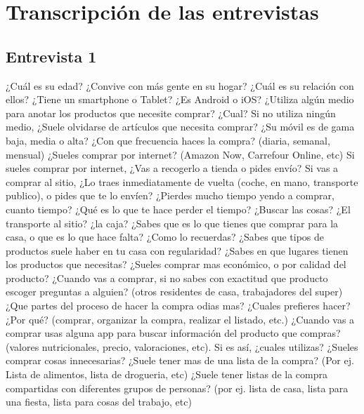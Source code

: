 \chapter{Transcripción de las entrevistas}
\label{ch:entrevistas}
\section{Entrevista 1}
\begin{description}
    \preg ¿Cuál es su edad?
    \preg ¿Convive con más gente en su hogar? ¿Cuál es su relación con ellos?
    \preg ¿Tiene un smartphone o Tablet? ¿Es Android o iOS?
    \preg ¿Utiliza algún medio para anotar los productos que necesite comprar? ¿Cual?
    \preg Si no utiliza ningún medio, ¿Suele olvidarse de artículos que necesita comprar?
    \preg ¿Su móvil es de gama baja, media o alta?
    \preg ¿Con que frecuencia haces la compra? (diaria, semanal, mensual)
    \preg ¿Sueles comprar por internet? (Amazon Now, Carrefour Online, etc)
    \preg Si sueles comprar por internet, ¿Vas a recogerlo a tienda o pides envío?
    \preg Si vas a comprar al sitio, ¿Lo traes inmediatamente de vuelta (coche, en mano, transporte publico), o pides que te lo envíen?
    \preg ¿Pierdes mucho tiempo yendo a comprar, cuanto tiempo?
    \preg ¿Qué es lo que te hace perder el tiempo? ¿Buscar las cosas? ¿El transporte al sitio? ¿la caja?
    \preg ¿Sabes que es lo que tienes que comprar para la casa, o que es lo que hace falta? ¿Como lo recuerdas?
    \preg ¿Sabes que tipos de productos suele haber en tu casa con regularidad?
    \preg ¿Sabes en que lugares tienen los productos que necesitas?
    \preg ¿Sueles comprar mas económico, o por calidad del producto?
    \preg ¿Cuando vas a comprar, si no sabes con exactitud que producto escoger preguntas a alguien? (otros residentes de casa, trabajadores del super)
    \preg ¿Que partes del proceso de hacer la compra odias mas? ¿Cuales prefieres hacer? ¿Por qué? (comprar, organizar la compra, realizar el listado, etc.)
    \preg ¿Cuando vas a comprar usas alguna app para buscar información del producto que compras? (valores nutricionales, precio, valoraciones, etc). Si es así, ¿cuales utilizas?
    \preg ¿Sueles comprar cosas innecesarias?
    \preg ¿Suele tener mas de una lista de la compra? (Por ej. Lista de alimentos, lista de drogueria, etc) 
    \preg ¿Suele tener listas de la compra compartidas con diferentes grupos de personas? (por ej. lista de casa, lista para una fiesta, lista para cosas del trabajo, etc)
\end{description}    

